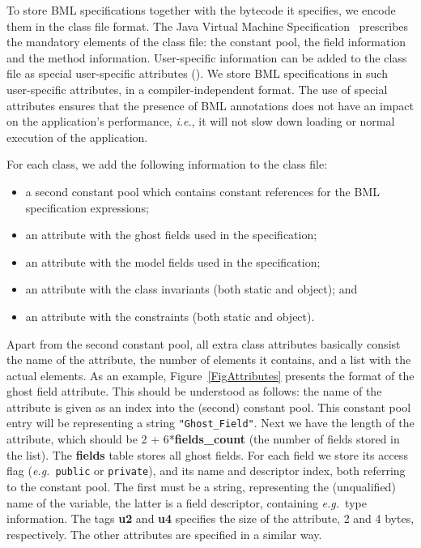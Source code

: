 To store BML specifications together with the bytecode it specifies,
we encode them in the class file format. The Java Virtual Machine
Specification~\cite{LindholmY99} prescribes the mandatory elements of the
class file: the constant pool, the field information and the method
information. User-specific information can be added to the class file
as special user-specific attributes (\cite[\S4.7.1]{LindholmY99}).  We
store BML specifications in such user-specific attributes, in a
compiler-independent format. The use of special attributes ensures
that the presence of BML annotations does not have an impact on the
application's performance, \emph{i.e.}, it will not slow down loading
or normal execution of the application.

For each class, we add the following information to the class file:
\begin{itemize}
\item a second constant pool which contains constant references
      for the BML specification expressions;
\item an attribute with the ghost fields used in the specification;
\item an attribute with the model fields used in the specification;
\item an attribute with the class invariants (both static and object); and
\item an attribute with the constraints (both static and object).
\end{itemize}
Apart from the second constant pool, all extra class attributes
basically consist the name of the attribute, the number of elements it
contains, and a list with the actual elements.  As an example,
Figure~\ref{FigAttributes} presents the format of the ghost field
attribute. This should be understood as follows: the name of the
attribute is given as an index into the (second) constant pool. This
constant pool entry will be representing a string
\texttt{"Ghost\_Field"}. Next we have the length of the attribute,
which should be 2 + 6*\textbf{fields\_count} (the number of fields
stored in the list). The \textbf{fields} table stores all ghost
fields. For each field we store its access flag (\emph{e.g.}\
\texttt{public} or
\texttt{private}), and its name and descriptor index, both
referring to the constant pool. The first must be a string,
representing the (unqualified) name of the variable, the latter is a
field descriptor, containing \emph{e.g.}\ type information.  The tags
\textbf{u2} and \textbf{u4} specifies the size of the attribute, 2 and
4 bytes, respectively. The other attributes are specified in a similar
way.



